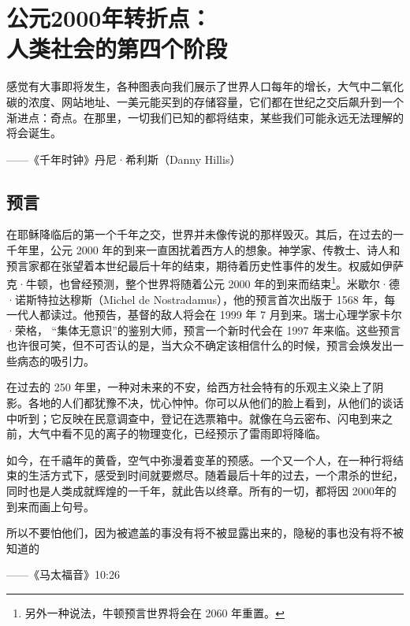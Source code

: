 \chapter[公元2000年转折点]{公元2000年转折点：\\ 人类社会的第四个阶段}

\begin{tcolorbox}
\kaishu 感觉有大事即将发生，各种图表向我们展示了世界人口每年的增长，大气中二氧化碳的浓度、网站地址、一美元能买到的存储容量，它们都在世纪之交后飙升到一个渐进点：奇点。在那里，一切我们已知的都将结束，某些我们可能永远无法理解的将会诞生。

\begin{flushright}
——《千年时钟》丹尼·希利斯（Danny Hillis）
\end{flushright}

\end{tcolorbox}


\section{预言}
在耶稣降临后的第一个千年之交，世界并未像传说的那样毁灭。其后，在过去的一千年里，公元 2000 年的到来一直困扰着西方人的想象。神学家、传教士、诗人和预言家都在张望着本世纪最后十年的结束，期待着历史性事件的发生。权威如伊萨克·牛顿，也曾经预测，整个世界将随着公元 2000 年的到来而结束\footnote{另外一种说法，牛顿预言世界将会在 2060 年重置。}。米歇尔·德·诺斯特拉达穆斯（Michel de Nostradamus），他的预言首次出版于 1568 年，每一代人都读过。他预告，基督的敌人将会在 1999 年 7 月到来。瑞士心理学家卡尔·荣格， “集体无意识”的鉴别大师，预言一个新时代会在 1997 年来临。这些预言也许很可笑，但不可否认的是，当大众不确定该相信什么的时候，预言会焕发出一些病态的吸引力。


在过去的 250 年里，一种对未来的不安，给西方社会特有的乐观主义染上了阴影。各地的人们都犹豫不决，忧心忡忡。你可以从他们的脸上看到，从他们的谈话中听到；它反映在民意调查中，登记在选票箱中。就像在乌云密布、闪电到来之前，大气中看不见的离子的物理变化，已经预示了雷雨即将降临。

如今，在千禧年的黄昏，空气中弥漫着变革的预感。一个又一个人，在一种行将结束的生活方式下，感受到时间就要燃尽。随着最后十年的过去，一个肃杀的世纪，同时也是人类成就辉煌的一千年，就此告以终章。所有的一切，都将因 2000年的到来而画上句号。



\begin{tcolorbox}
\kaishu 所以不要怕他们，因为被遮盖的事没有将不被显露出来的，隐秘的事也没有将不被知道的
\begin{flushright}
——《马太福音》10:26
\end{flushright}
\end{tcolorbox}

